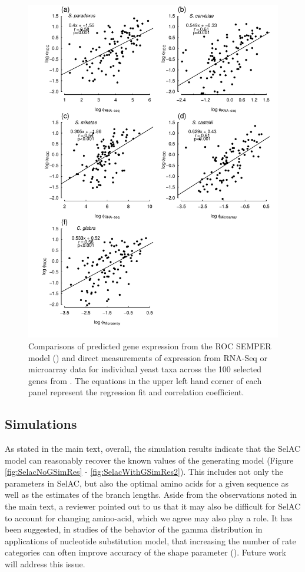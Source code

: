 \documentclass[onecolumn,letterpaper,fleqn,nogrid]{myMBE}%
\newcommand{\selac}{SelAC\xspace}
\begin{document}
\begin{figure}[H]
  \centering
  \includegraphics[width=0.9\linewidth]{FIGURE_S2_Empirical_vs_ROC_by_spp_ALLspp.pdf}
  \caption{Comparisons of predicted gene expression from the ROC SEMPER model (\citet{GilchristEtAl2015}) and direct measurements of expression from RNA-Seq or microarray data for individual yeast taxa across the 100 selected genes from \citet{SalichosAndRokas2013}.
        The equations in the upper left hand corner of each panel represent the regression fit and correlation coefficient.
}
  \label{fig:ROCvsEmpirical}
\end{figure}


\subsection{Simulations}
As stated in the main text, overall, the simulation results indicate that the SelAC model can reasonably recover the known values of the generating model (Figure \ref{fig:SelacNoGSimRes} - \ref{fig:SelacWithGSimRes2}).
This includes not only the parameters in \selac, but also the optimal amino acids for a given sequence as well as the estimates of the branch lengths.
Aside from the observations noted in the main text, a reviewer pointed out to us that it may also be difficult for \selac to account for changing amino-acid, which we agree may also play a role.
It has been suggested, in studies of the behavior of the gamma distribution in applications of nucleotide substitution model, that increasing the number of rate categories can often improve accuracy of the shape parameter (\citet{MayroseEtAl2005}).
Future work will address this issue.
\end{document}
